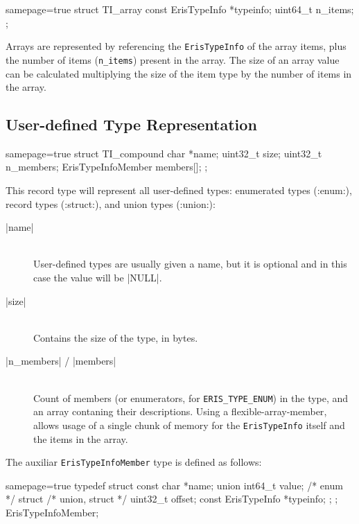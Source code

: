 \begin{ccode*}{samepage=true}
  struct TI_array {
    const ErisTypeInfo *typeinfo;
    uint64_t            n_items;
  };
\end{ccode*}

\noindent
Arrays are represented by referencing the \verb|ErisTypeInfo| of the array
items, plus the number of items (\verb|n_items|) present in the array. The
size of an array value can be calculated multiplying the size of the item type
by the number of items in the array.


\subsection{User-defined Type Representation}

\begin{ccode*}{samepage=true}
  struct TI_compound {
    char              *name;
    uint32_t           size;
    uint32_t           n_members;
    ErisTypeInfoMember members[];
  };
\end{ccode*}

\noindent
This record type will represent all user-defined types: enumerated types
(\Mc:enum:), record types (\Mc:struct:), and union types (\Mc:union:):

\begin{description}
  \item [\Mc|name|] \hfill \\
    User-defined types are usually given a name, but it is optional and in
    this case the value will be \Mc|NULL|.
  \item [\Mc|size|] \hfill \\
    Contains the size of the type, in bytes.
  \item [\Mc|n_members| / \Mc|members|] \hfill \\
    Count of members (or enumerators, for \verb|ERIS_TYPE_ENUM|) in the type,
    and an array contaning their descriptions. Using
    a \gls{flexible-array-member}, allows usage of a single chunk of memory
    for the \verb|ErisTypeInfo| itself and the items in the array.
\end{description}

\noindent
The auxiliar \verb|ErisTypeInfoMember| type is defined as follows:

\begin{ccode*}{samepage=true}
  typedef struct {
    const char             *name;
    union {
      int64_t               value; /* enum */
      struct {                     /* union, struct */
        uint32_t            offset;
        const ErisTypeInfo *typeinfo;
      };
    };
  } ErisTypeInfoMember;
\end{ccode*}

